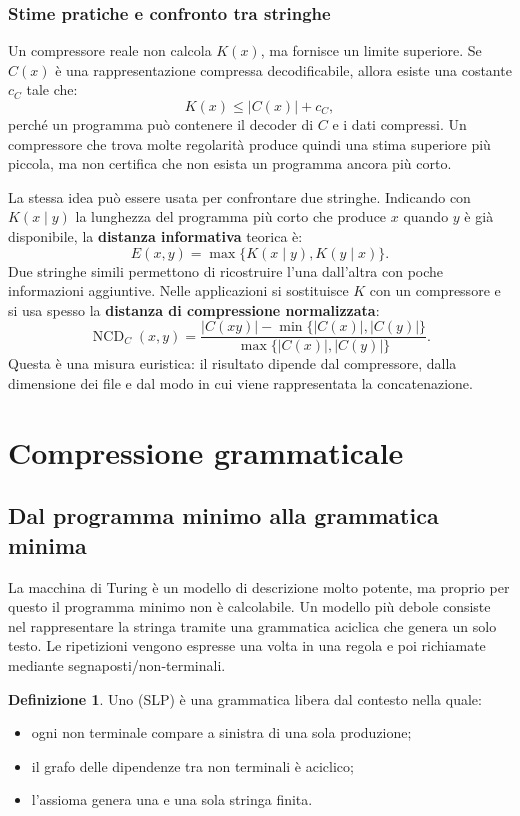 \documentclass{article}
\theoremstyle{definition}
\newtheorem{definizione}{Definizione}[section]
\numberwithin{equation}{section}
\begin{document}
\subsubsection{Stime pratiche e confronto tra stringhe}
Un compressore reale non calcola $K(x)$, ma fornisce un limite superiore. Se
$C(x)$ è una rappresentazione compressa decodificabile, allora esiste una
costante $c_C$ tale che:
\[
    K(x)\leq |C(x)|+c_C,
\]
perché un programma può contenere il decoder di $C$ e i dati compressi. Un
compressore che trova molte regolarità produce quindi una stima superiore più
piccola, ma non certifica che non esista un programma ancora più corto.

La stessa idea può essere usata per confrontare due stringhe. Indicando con
$K(x\mid y)$ la lunghezza del programma più corto che produce $x$ quando $y$
è già disponibile, la \textbf{distanza informativa} teorica è:
\[
    E(x,y)=\max\{K(x\mid y),K(y\mid x)\}.
\]
Due stringhe simili permettono di ricostruire l'una dall'altra con poche
informazioni aggiuntive. Nelle applicazioni si sostituisce $K$ con un
compressore e si usa spesso la \textbf{distanza di compressione normalizzata}:
\[
    \operatorname{NCD}_C(x,y)
    =
    \frac{
        |C(xy)|-\min\{|C(x)|,|C(y)|\}
    }{
        \max\{|C(x)|,|C(y)|\}
    }.
\]
Questa è una misura euristica: il risultato dipende dal compressore, dalla
dimensione dei file e dal modo in cui viene rappresentata la concatenazione.

\section{Compressione grammaticale}
\subsection{Dal programma minimo alla grammatica minima}
La macchina di Turing è un modello di descrizione molto potente, ma proprio per
questo il programma minimo non è calcolabile. Un modello più debole consiste
nel rappresentare la stringa tramite una grammatica aciclica che genera un solo
testo. Le ripetizioni vengono espresse una volta in una regola e poi richiamate
mediante segnaposti/non-terminali.

\begin{definizione}
    Uno \textbf{} (SLP) è una grammatica libera
    dal contesto nella quale:
    \begin{itemize}
        \item ogni non terminale compare a sinistra di una sola produzione;
        \item il grafo delle dipendenze tra non terminali è aciclico;
        \item l'assioma genera una e una sola stringa finita.
    \end{itemize}
\end{definizione}
\end{document}

